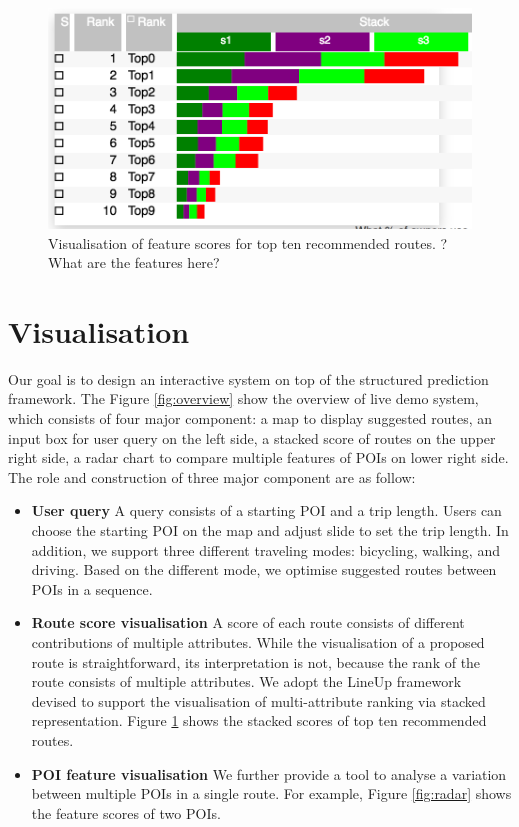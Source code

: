 \documentclass[sigconf]{acmart}
\begin{document}
\begin{figure}[t!]
\includegraphics[width=0.9\linewidth]{figure/sample_stack.png}
\caption{Visualisation of feature scores for top ten recommended routes. ?What are the features here?}
\label{fig:stack}
\end{figure}

\section{Visualisation}
Our goal is to design an interactive system on top of the structured prediction framework.
The Figure \ref{fig:overview} show the overview of live demo system, which consists of four major component: a map to display suggested routes, an input box for user query on the left side, a stacked score of routes on the upper right side, a radar chart to compare multiple features of POIs on lower right side. The role and construction of three major component are as follow:
\begin{itemize}
\item \textbf{User query} A query consists of a starting POI and a trip length. Users can choose the starting POI on the map and adjust slide to set the trip length. In addition, we support three different traveling modes: bicycling, walking, and driving. Based on the different mode, we optimise suggested routes between POIs in a sequence.
\item \textbf{Route score visualisation} A score of each route consists of different contributions of multiple attributes. While the visualisation of a proposed route is straightforward, its interpretation is not, because the rank of the route consists of multiple attributes. We adopt the LineUp framework~\cite{gratzl2013lineup} devised to support the visualisation of multi-attribute ranking via stacked representation. Figure \ref{fig:stack} shows the stacked scores of top ten recommended routes.
\item \textbf{POI feature visualisation} We further provide a tool to analyse a variation between multiple POIs in a single route. For example, Figure \ref{fig:radar} shows the feature scores of two POIs. 
\end{itemize}
\end{document}

